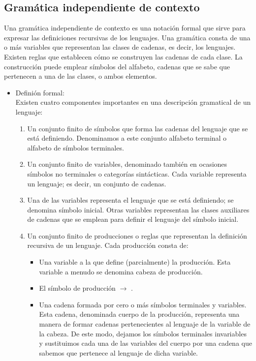 \documentclass[12pt,a4paper,spanish]{book}
\begin{document}
\subsection{Gram\'atica independiente de contexto}
Una gram\'atica independiente de contexto es una notaci\'on formal que sirve para expresar las definiciones recursivas de los lenguajes. Una gram\'atica consta de una o m\'as variables que representan las clases de cadenas, es decir, los lenguajes. Existen reglas que establecen c\'omo se construyen las cadenas de cada clase. La construcci\'on puede emplear s\'imbolos del alfabeto, cadenas que se sabe que pertenecen a una de las clases, o ambos elementos.

\begin{itemize}
\item Defini\'on formal:\\
Existen cuatro componentes importantes en una descripci\'on gramatical de un lenguaje:
\begin{enumerate}
\item Un conjunto finito de s\'imbolos que forma las cadenas del lenguaje que se est\'a definiendo. Denominamos a este conjunto alfabeto terminal o alfabeto de s\'imbolos terminales.\\
\item Un conjunto finito de variables, denominado tambi\'en en ocasiones s\'imbolos no terminales o categor\'ias sint\'acticas. Cada variable representa un lenguaje; es decir, un conjunto de cadenas.\\
\item Una de las variables representa el lenguaje que se est\'a definiendo; se denomina s\'imbolo inicial. Otras variables representan las clases auxiliares de cadenas que se emplean para definir el lenguaje del s\'imbolo inicial.
\item Un conjunto finito de producciones o reglas que representan la definici\'on recursiva de un lenguaje. Cada producci\'on consta de:\\
\begin{itemize}
\item Una variable a la que define (parcialmente) la producci\'on. Esta variable a menudo se denomina cabeza de producci\'on.\\
\item El s\'imbolo de producci\'on $\rightarrow$ . \\
\item Una cadena formada por cero o m\'as s\'imbolos terminales y variables. Esta cadena, denominada cuerpo de la producci\'on, representa una manera de formar cadenas pertenecientes al lenguaje de la variable de la cabeza. De este modo, dejamos los s\'imbolos terminales invariables y sustituimos cada una de las variables del cuerpo por una cadena que sabemos que pertenece al lenguaje de dicha variable.\\
\end{itemize}
\end{enumerate}


\end{itemize}
\end{document}
